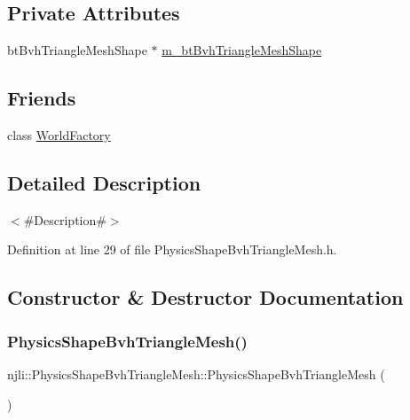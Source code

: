 \subsection*{Private Attributes}
\begin{DoxyCompactItemize}
\item 
bt\+Bvh\+Triangle\+Mesh\+Shape $\ast$ \mbox{\hyperlink{classnjli_1_1_physics_shape_bvh_triangle_mesh_a3e9723a04a224603d3349a898bf6746b}{m\+\_\+bt\+Bvh\+Triangle\+Mesh\+Shape}}
\end{DoxyCompactItemize}
\subsection*{Friends}
\begin{DoxyCompactItemize}
\item 
class \mbox{\hyperlink{classnjli_1_1_physics_shape_bvh_triangle_mesh_acb96ebb09abe8f2a37a915a842babfac}{World\+Factory}}
\end{DoxyCompactItemize}


\subsection{Detailed Description}
$<$\#\+Description\#$>$ 

Definition at line 29 of file Physics\+Shape\+Bvh\+Triangle\+Mesh.\+h.



\subsection{Constructor \& Destructor Documentation}
\mbox{\label{classnjli_1_1_physics_shape_bvh_triangle_mesh_ad8459c8e754640e092b27ebf0af6d380}} 
\subsubsection{\texorpdfstring{Physics\+Shape\+Bvh\+Triangle\+Mesh()}{PhysicsShapeBvhTriangleMesh()}\hspace{0.1cm}{\footnotesize\ttfamily [1/3]}}
{\footnotesize\ttfamily njli\+::\+Physics\+Shape\+Bvh\+Triangle\+Mesh\+::\+Physics\+Shape\+Bvh\+Triangle\+Mesh (\begin{DoxyParamCaption}{ }\end{DoxyParamCaption})\hspace{0.3cm}{\ttfamily [protected]}}

